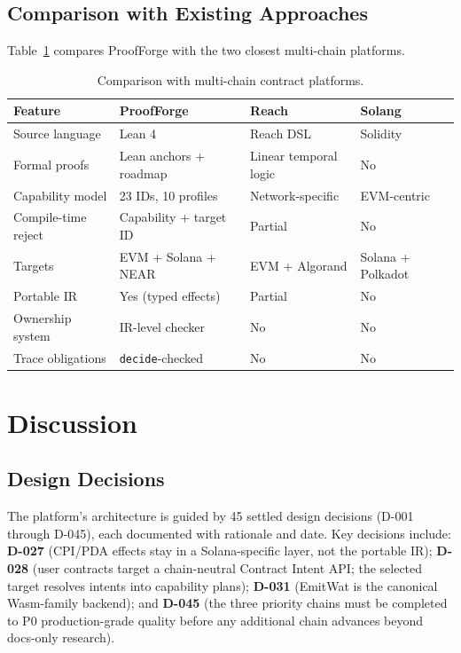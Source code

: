 \documentclass[sigconf]{acmart}
\newcommand{\ttab}{\scriptsize}
\begin{document}
\subsection{Comparison with Existing Approaches}

Table~\ref{tab:compare} compares ProofForge with the two closest multi-chain platforms.

\begin{table}[t]
  \caption{Comparison with multi-chain contract platforms.}
  \label{tab:compare}
  \centering
  \ttab
  \begin{tabularx}{\textwidth}{l X X X}
    \toprule
    \bfseries Feature & \bfseries ProofForge & \bfseries Reach & \bfseries Solang \\
    \midrule
    Source language        & Lean 4 & Reach DSL & Solidity \\
    Formal proofs          & Lean anchors + roadmap & Linear temporal logic & No \\
    Capability model       & 23 IDs, 10 profiles & Network-specific & EVM-centric \\
    Compile-time reject    & Capability + target ID & Partial & No \\
    Targets                & EVM + Solana + NEAR & EVM + Algorand & Solana + Polkadot \\
    Portable IR            & Yes (typed effects) & Partial & No \\
    Ownership system       & IR-level checker & No & No \\
    Trace obligations      & \texttt{decide}-checked & No & No \\
    \bottomrule
  \end{tabularx}
\end{table}

\section{Discussion}
\label{sec:disc}

\subsection{Design Decisions}

The platform's architecture is guided by 45 settled design decisions (D-001 through D-045), each
documented with rationale and date. Key decisions include: \textbf{D-027} (CPI/PDA effects stay
in a Solana-specific layer, not the portable IR); \textbf{D-028} (user contracts target a
chain-neutral Contract Intent API; the selected target resolves intents into capability plans);
\textbf{D-031} (EmitWat is the canonical Wasm-family backend); and \textbf{D-045} (the three
priority chains must be completed to P0 production-grade quality before any additional chain
advances beyond docs-only research).
\end{document}

